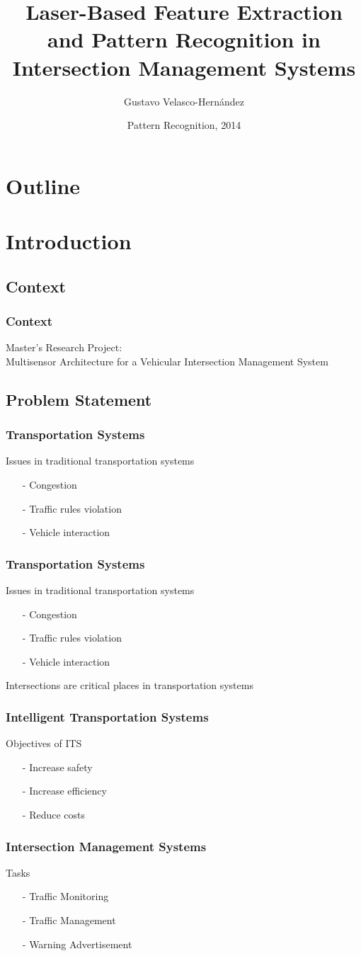 \documentclass[table]{beamer}
\title[Laser-Based Feature Extraction and Pattern Recognition in IMS]{Laser-Based Feature Extraction and Pattern Recognition in Intersection Management Systems}
\author{Gustavo Velasco-Hernández}
\institute[Universidad del Valle]
{
	
}
\date{Pattern Recognition, 2014}
\begin{document}
\frame{\titlepage}
\section*{Outline}

\frame{\tableofcontents}
\section{Introduction}

\subsection{Context}
\frame
{
	\frametitle{Context}
	Master's Research Project:\\
	Multisensor Architecture for a Vehicular Intersection Management System
}
\subsection{Problem Statement}
\frame
{
	\frametitle{Transportation Systems}
	Issues in traditional transportation systems
	\begin{itemize}
		\item[-] Congestion
		\item[-] Traffic rules violation
		\item[-] Vehicle interaction
	\end{itemize}
}

\frame
{
	\frametitle{Transportation Systems}
	Issues in traditional transportation systems
	\begin{itemize}
		\item[-] Congestion
		\item[-] Traffic rules violation
		\item[-] Vehicle interaction
	\end{itemize}
	Intersections are critical places in transportation systems
}

\frame
{
	\frametitle{Intelligent Transportation Systems}
	Objectives of ITS
	\begin{itemize}
		\item[-] Increase safety
		\item[-] Increase efficiency
		\item[-] Reduce costs
	\end{itemize}
}

\frame
{
	\frametitle{Intersection Management Systems}
	Tasks
	\begin{itemize}
		\item[-] Traffic Monitoring
		\item[-] Traffic Management
		\item[-] Warning Advertisement
	\end{itemize}
}
\end{document}
